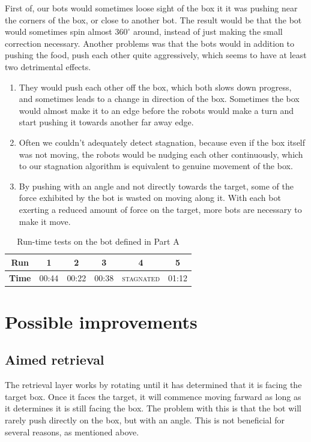 \documentclass[a4paper,10pt]{article}
\begin{document}
First of, our bots would sometimes loose sight of the box it it was
pushing near the corners of the box, or close to another bot. The result would
be that the bot would sometimes spin almost $360^\circ$ around, instead of
just making the small correction necessary. Another problems was that the
bots would in addition to pushing the food, push each other quite aggressively,
which seems to have at least two detrimental effects.
\begin{enumerate}
\item They would push
each other off the box, which both slows down progress, and sometimes
leads to a change in direction of the box. Sometimes the box would almost
make it to an edge before the robots would make a turn and start pushing
it towards another far away edge.
\item Often we couldn't adequately detect stagnation, because even if
the box itself was not moving, the robots would be nudging each other
continuously, which to our stagnation algorithm is equivalent to genuine
movement of the box.
\item By pushing with an angle and not directly towards the target, some of 
    the force exhibited by the bot is wasted on moving along it. With each bot 
    exerting a reduced amount of force on the target, more bots are necessary 
    to make it move.
\end{enumerate}

\begin{table}
    \centering
    \begin{tabular}{c|c|c|c|c|c}
        \textbf{Run}    & \textbf{1} & \textbf{2} & \textbf{3} &
        \textbf{4}      & \textbf{5}     \\ \hline
        \textbf{Time}   & 00:44 & 00:22 & 00:38 &
        \textsc{stagnated} & 01:12 \\
    \end{tabular}
    \caption{Run-time tests on the bot defined in Part A}
\end{table}


\section{Possible improvements}
\label{sec:b1}

\subsection{Aimed retrieval}

The retrieval layer works by rotating until it has determined that it is 
facing the target box. Once it faces the target, it will commence moving 
farward as long as it determines it is still facing the box. The problem with 
this is that the bot will rarely push directly on the box, but with an angle.  
This is not beneficial for several reasons, as mentioned above.
\end{document}
